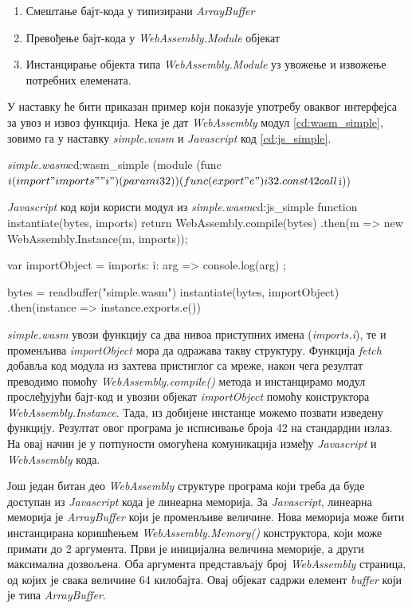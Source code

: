 \documentclass[12pt,oneside]{memoir}
\begin{document}
\begin{enumerate}
	\item Смештање бајт-кода у типизирани \textit{ArrayBuffer}
	\item Превођење бајт-кода у \textit{WebAssembly.Module} објекат
	\item Инстанцирање објекта типа \textit{WebAssembly.Module} уз увожење и извожење потребних елемената.
\end{enumerate}

У наставку ће бити приказан пример који показује употребу оваквог интерфејса за увоз и извоз функција. Нека је дат \textit{WebAssembly} модул
\ref{cd:wasm_simple}, зовимо га у наставку \textit{simple.wasm} и \textit{Javascript} код \ref{cd:js_simple}.

\begin{code}{\textit{simple.wasm}}{cd:wasm_simple}
(module
	(func $i (import "imports" "i") (param i32))
	(func (export "e")
		i32.const 42
		call $i))
\end{code}

\begin{code}{\textit{Javascript} код који користи модул из \textit{simple.wasm}}{cd:js_simple}
function instantiate(bytes, imports) {
	return WebAssembly.compile(bytes)
	.then(m => new WebAssembly.Instance(m, imports));
}

var importObject = 
	{ imports: { i: arg => console.log(arg) } };

bytes = readbuffer("simple.wasm")
instantiate(bytes, importObject)
.then(instance => instance.exports.e())
\end{code}

\textit{simple.wasm} увози функцију са два нивоа приступних имена (\textit{imports.i}), те и
променљива \textit{importObject} мора да одражава такву структуру. Функција \textit{fetch} добавља код модула из захтева 
пристиглог са мреже, након чега резултат преводимо помоћу \textit{WebAssembly.compile()} метода и инстанцирамо модул прослеђујући бајт-код
и увозни објекат \textit{importObject} помоћу конструктора \textit{WebAssembly.Instance}. Тада, из добијене инстанце можемо позвати
изведену функцију. Резултат овог програма је исписивање броја 42 на стандардни излаз. На овај начин је у потпуности омогућена комуникација
између \textit{Javascript} и \textit{WebAssembly} кода.

Још један битан део \textit{WebAssembly} структуре програма који треба да буде доступан из \textit{Javascript} кода је
линеарна меморија. За \textit{Javascript}, линеарна меморија је \textit{ArrayBuffer} који је променљиве величине. Нова меморија
може бити инстанцирана коришћењем \textit{WebAssembly.Memory()} конструктора, који може примати до 2 аргумента. Први је иницијална
величина меморије, а други максимална дозвољена. Оба аргумента представљају број \textit{WebAssembly} страница, од којих је свака
величине 64 килобајта. Овај објекат садржи елемент \textit{buffer} који је типа \textit{ArrayBuffer}.
\end{document}
